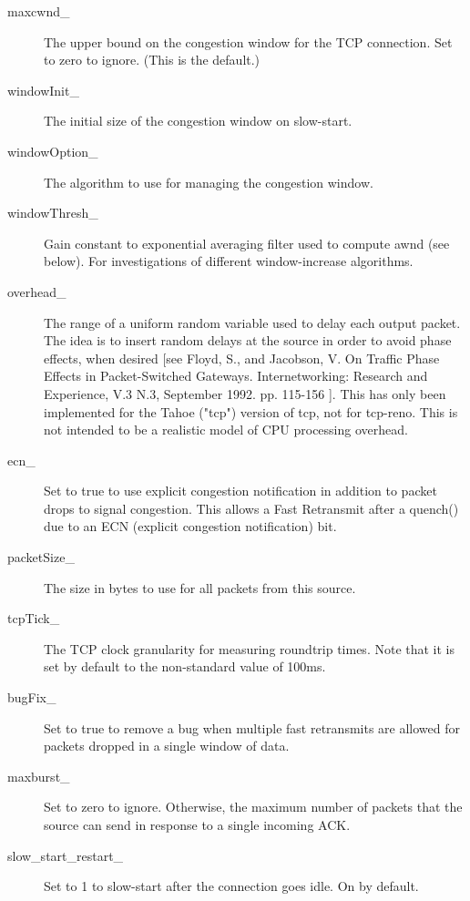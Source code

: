\begin{description}
\begin{description}
\item[maxcwnd\_]
The upper bound on the congestion window for the TCP connection. Set to
zero to ignore. (This is the default.) 

\item[windowInit\_]
The initial size of the congestion window on slow-start. 

\item[windowOption\_]
The algorithm to use for managing the congestion window. 

\item[windowThresh\_]
Gain constant to exponential averaging filter used to compute awnd (see
below). For investigations of different window-increase algorithms. 

\item[overhead\_]
The range of a uniform random variable used to delay each output packet.
The idea is to insert random delays at the source in order to avoid phase
effects, when desired [see Floyd, S., and Jacobson, V. On Traffic Phase
Effects in Packet-Switched Gateways. Internetworking: Research and
Experience, V.3 N.3, September 1992. pp. 115-156 ]. This has only been
implemented for the Tahoe ("tcp") version of tcp, not for tcp-reno. This
is not intended to be a realistic model of CPU processing overhead. 

\item[ecn\_] Set to true to use explicit congestion notification in
addition to packet drops to signal congestion. This allows a Fast
Retransmit after a quench() due to an ECN (explicit congestion
notification) bit. 

\item[packetSize\_]
The size in bytes to use for all packets from this source. 

\item[tcpTick\_]
The TCP clock granularity for measuring roundtrip times. Note that it is
set by default to the non-standard value of 100ms. 

\item[bugFix\_]
Set to true to remove a bug when multiple fast retransmits are allowed for
packets dropped in a single window of data. 

\item[maxburst\_]
Set to zero to ignore. Otherwise, the maximum number of packets that the
source can send in response to a single incoming ACK. 

\item[slow\_start\_restart\_]
Set to 1 to slow-start after the connection goes idle. On by default. 


\end{description}
\end{description}
